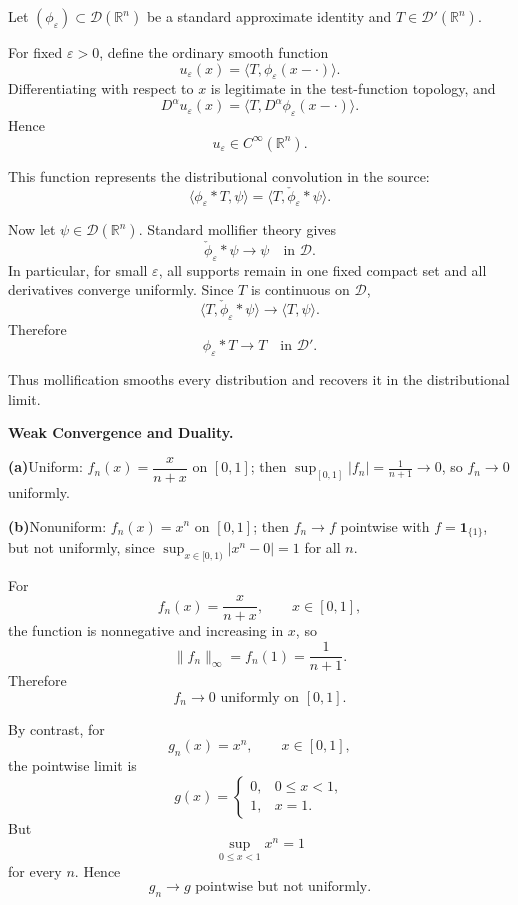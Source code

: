 \begin{solution}
Let \((\phi_\varepsilon)\subset\mathcal D(\mathbb R^n)\) be a standard approximate identity
and \(T\in\mathcal D'(\mathbb R^n)\).

For fixed \(\varepsilon>0\), define the ordinary smooth function
\[
u_\varepsilon(x)
=
\langle T,\phi_\varepsilon(x-\cdot)\rangle.
\]
Differentiating with respect to \(x\) is legitimate in the test-function topology, and
\[
D^\alpha u_\varepsilon(x)
=
\langle T,D^\alpha\phi_\varepsilon(x-\cdot)\rangle.
\]
Hence
\[
\boxed{u_\varepsilon\in C^\infty(\mathbb R^n).}
\]

This function represents the distributional convolution in the source:
\[
\langle\phi_\varepsilon*T,\psi\rangle
=
\langle T,\check\phi_\varepsilon*\psi\rangle.
\]

Now let \(\psi\in\mathcal D(\mathbb R^n)\). Standard mollifier theory gives
\[
\check\phi_\varepsilon*\psi
\longrightarrow
\psi
\quad\text{in }\mathcal D.
\]
In particular, for small \(\varepsilon\), all supports remain in one fixed compact set and
all derivatives converge uniformly. Since \(T\) is continuous on \(\mathcal D\),
\[
\langle T,\check\phi_\varepsilon*\psi\rangle
\longrightarrow
\langle T,\psi\rangle.
\]
Therefore
\[
\boxed{
\phi_\varepsilon*T
\to
T
\quad\text{in }\mathcal D'.
}
\]

Thus mollification smooths every distribution and recovers it in the distributional limit.
\end{solution}


\begin{problem}[CP-II-0423]
\label{prob:cp-ii-0423}
\textbf{Weak Convergence and Duality.}

\hfill

		\par\smallskip\noindent\textbf{(a)}\quad Uniform: $f_n(x)=\dfrac{x}{n+x}$ on $[0,1]$; then
		$\sup_{[0,1]}|f_n|=\frac{1}{n+1}\to0$, so $f_n\to0$ uniformly.
		\par\smallskip\noindent\textbf{(b)}\quad Nonuniform: $f_n(x)=x^n$ on $[0,1]$; then $f_n\to f$ pointwise with
		$f=\mathbf 1_{\{1\}}$, but not uniformly, since
		$\sup_{x\in[0,1)}|x^n-0|=1$ for all $n$.
\end{problem}

\begin{solution}
For
\[
f_n(x)=\frac{x}{n+x},
\qquad
x\in[0,1],
\]
the function is nonnegative and increasing in \(x\), so
\[
\|f_n\|_\infty
=
f_n(1)
=
\frac1{n+1}.
\]
Therefore
\[
\boxed{
f_n\to0
\text{ uniformly on }[0,1].
}
\]

By contrast, for
\[
g_n(x)=x^n,
\qquad
x\in[0,1],
\]
the pointwise limit is
\[
g(x)
=
\begin{cases}
0,&0\le x<1,\\
1,&x=1.
\end{cases}
\]
But
\[
\sup_{0\le x<1}x^n=1
\]
for every \(n\). Hence
\[
\boxed{
g_n\to g\text{ pointwise but not uniformly}.
}
\]
\end{solution}



